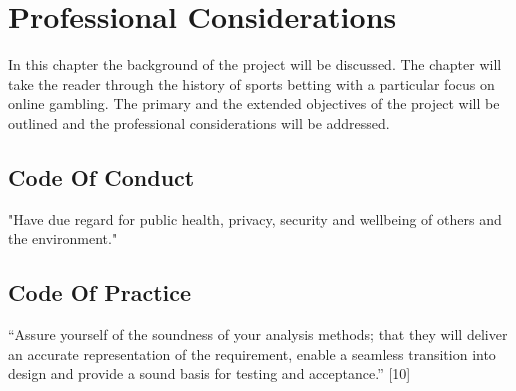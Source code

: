 \chapter{Professional Considerations}
\label{ch:ProfConsiderations}
In this chapter the background of the project will be discussed. The chapter will take the reader through the history of sports betting with a particular focus on online gambling. The primary and the extended objectives of the project will be outlined and the professional considerations will be addressed. 

\section{Code Of Conduct}
\label{sec:codeofconduct_prof}

"Have due regard for public health, privacy, security and wellbeing of others and the environment."


\section{Code Of Practice}
\label{sec:codeofconduct_prof}

“Assure yourself of the soundness of your analysis methods; that they will deliver an accurate representation of the requirement, enable a seamless transition into design and provide a sound basis for testing and acceptance.” [10]
